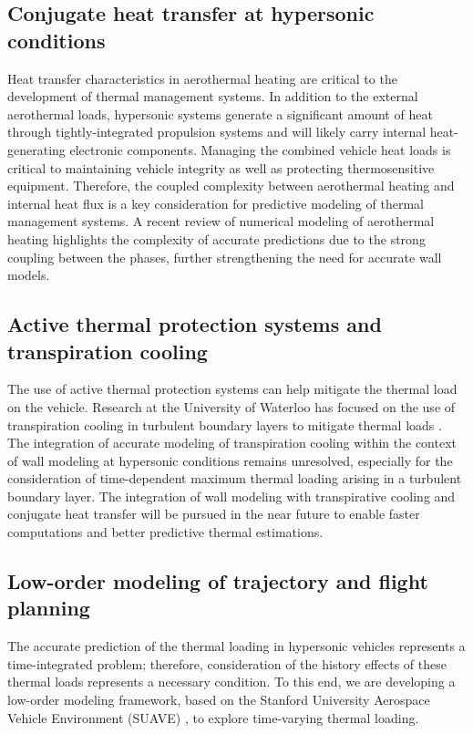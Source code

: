 \documentclass [11pt, fancyhdr, twoside] {article}
\begin{document}
\subsection{Conjugate heat transfer at hypersonic conditions}
Heat transfer characteristics in aerothermal heating are critical to the development of thermal management systems. In addition to the external aerothermal loads, hypersonic systems generate a significant amount of heat through tightly-integrated propulsion systems and will likely carry internal heat-generating electronic components. Managing the combined vehicle heat loads is critical to maintaining vehicle integrity as well as protecting thermosensitive equipment. Therefore, the coupled complexity between aerothermal heating and internal heat flux is a key consideration for predictive modeling of thermal management systems. A recent review of numerical modeling of aerothermal heating \citep{Lewis_Hickey_2023} highlights the complexity of accurate predictions due to the strong coupling between the phases, further strengthening the need for accurate wall models.



\subsection{Active thermal protection systems and transpiration cooling}
The use of active thermal protection systems can help mitigate the thermal load on the vehicle. Research at the University of Waterloo has focused on the use of transpiration cooling in turbulent boundary layers to mitigate thermal loads \citep{Christopher_Peter_Kloker_Hickey_2020,Bukva_Zhang_Christopher_Hickey_2021}. The integration of accurate modeling of transpiration cooling within the context of wall modeling at hypersonic conditions remains unresolved, especially for the consideration of time-dependent maximum thermal loading arising in a turbulent boundary layer. The integration of wall modeling with transpirative cooling and conjugate heat transfer will be pursued in the near future to enable faster computations and better predictive thermal estimations.




\subsection{Low-order modeling of trajectory and flight planning}

The accurate prediction of the thermal loading in hypersonic vehicles represents a time-integrated problem; therefore, consideration of the history effects of these thermal loads represents a necessary condition. To this end, we are developing a low-order modeling framework, based on the Stanford University Aerospace Vehicle Environment (SUAVE) \citep{MacDonald_SUAVE_2017}, to explore time-varying thermal loading. 
\end{document}
